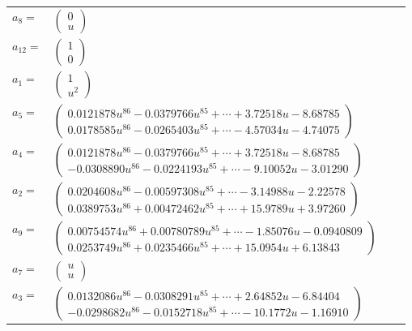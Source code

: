 \documentclass[1p]{elsarticle_modified}
\theoremstyle{definition}
\begin{document}
\begin{tabular}{m{7pt} m{180pt} m{7pt} m{180pt} }
\flushright $a_{8}=$&$\begin{pmatrix}0\\u\end{pmatrix}$ \\
\flushright $a_{12}=$&$\begin{pmatrix}1\\0\end{pmatrix}$ \\
\flushright $a_{1}=$&$\begin{pmatrix}1\\u^2\end{pmatrix}$ \\
\flushright $a_{5}=$&$\begin{pmatrix}0.0121878 u^{86}-0.0379766 u^{85}+\cdots+3.72518 u-8.68785\\0.0178585 u^{86}-0.0265403 u^{85}+\cdots-4.57034 u-4.74075\end{pmatrix}$ \\
\flushright $a_{4}=$&$\begin{pmatrix}0.0121878 u^{86}-0.0379766 u^{85}+\cdots+3.72518 u-8.68785\\-0.0308890 u^{86}-0.0224193 u^{85}+\cdots-9.10052 u-3.01290\end{pmatrix}$ \\
\flushright $a_{2}=$&$\begin{pmatrix}0.0204608 u^{86}-0.00597308 u^{85}+\cdots-3.14988 u-2.22578\\0.0389753 u^{86}+0.00472462 u^{85}+\cdots+15.9789 u+3.97260\end{pmatrix}$ \\
\flushright $a_{9}=$&$\begin{pmatrix}0.00754574 u^{86}+0.00780789 u^{85}+\cdots-1.85076 u-0.0940809\\0.0253749 u^{86}+0.0235466 u^{85}+\cdots+15.0954 u+6.13843\end{pmatrix}$ \\
\flushright $a_{7}=$&$\begin{pmatrix}u\\u\end{pmatrix}$ \\
\flushright $a_{3}=$&$\begin{pmatrix}0.0132086 u^{86}-0.0308291 u^{85}+\cdots+2.64852 u-6.84404\\-0.0298682 u^{86}-0.0152718 u^{85}+\cdots-10.1772 u-1.16910\end{pmatrix}$ \\

\end{tabular}
\end{document}
